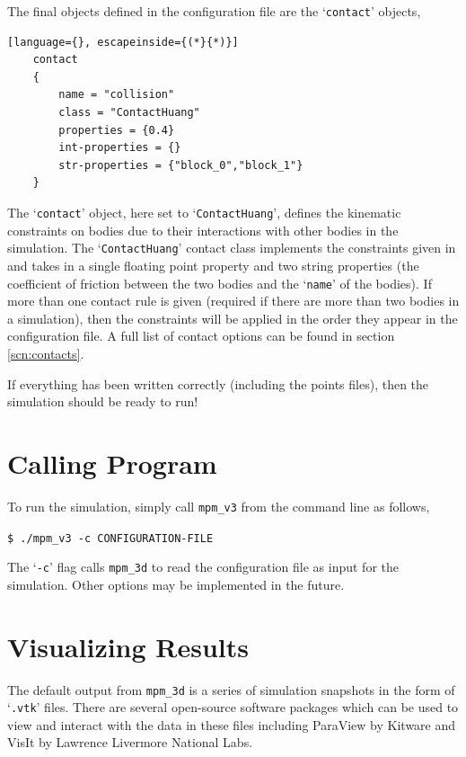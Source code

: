 The final objects defined in the configuration file are the `\texttt{contact}' objects,
\begin{lstlisting}[language={}, escapeinside={(*}{*)}]
    contact
    {
        name = "collision"
        class = "ContactHuang"
        properties = {0.4}
        int-properties = {}
        str-properties = {"block_0","block_1"}
    }
\end{lstlisting}
The `\texttt{contact}' object, here set to `\texttt{ContactHuang}', defines the kinematic constraints on bodies due to their interactions with other bodies in the simulation. The `\texttt{ContactHuang}' contact class implements the constraints given in \cite{huang2011} and takes in a single floating point property and two string properties (the coefficient of friction between the two bodies and the `\texttt{name}' of the bodies). If more than one contact rule is given (required if there are more than two bodies in a simulation), then the constraints will be applied in the order they appear in the configuration file. A full list of contact options can be found in section \ref{scn:contacts}.

If everything has been written correctly (including the points files), then the simulation should be ready to run!

\section{Calling Program}
To run the simulation, simply call \texttt{mpm\_v3} from the command line as follows,

\texttt{\$ ./mpm\_v3 -c CONFIGURATION-FILE}

The `\texttt{-c}' flag calls \texttt{mpm\_3d} to read the configuration file as input for the simulation. Other options may be implemented in the future.


\section{Visualizing Results}
The default output from \texttt{mpm\_3d} is a series of simulation snapshots in the form of `\texttt{.vtk}' files. There are several open-source software packages which can be used to view and interact with the data in these files including ParaView by Kitware and VisIt by Lawrence Livermore National Labs.
